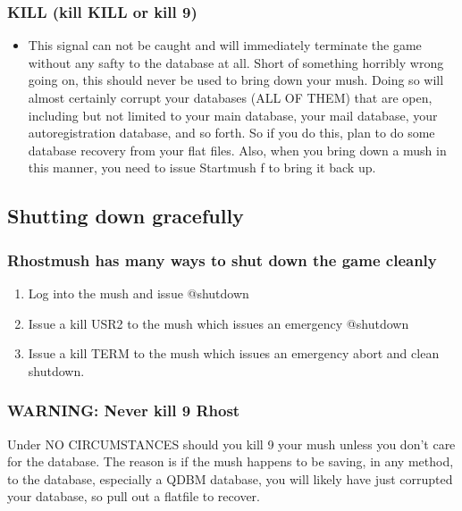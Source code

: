 \documentclass[letterpaper,10pt,english]{sphinxmanual}
\begin{document}
\subsubsection{KILL (kill \sphinxhyphen{}KILL or kill \sphinxhyphen{}9)}
\label{\detokenize{maintenance:kill-kill-kill-or-kill-9}}\begin{itemize}
\item {} 
\sphinxAtStartPar
This signal can not be caught and will immediately terminate the game
without any safty to the database at all.  Short of something horribly
wrong going on, this should never be used to bring down your mush.
Doing so will almost certainly corrupt your databases (ALL OF THEM)
that are open, including but not limited to your main database, your
mail database, your autoregistration database, and so forth.  So if
you do this, plan to do some database recovery from your flat files.
Also, when you bring down a mush in this manner, you need to issue
Startmush \sphinxhyphen{}f to bring it back up.

\end{itemize}


\subsection{Shutting down gracefully}
\label{\detokenize{maintenance:shutting-down-gracefully}}

\subsubsection{Rhostmush has many ways to shut down the game cleanly}
\label{\detokenize{maintenance:rhostmush-has-many-ways-to-shut-down-the-game-cleanly}}\begin{enumerate}
%
\item {} 
\sphinxAtStartPar
Log into the mush and issue @shutdown

\item {} 
\sphinxAtStartPar
Issue a kill \sphinxhyphen{}USR2 to the mush which issues an emergency @shutdown

\item {} 
\sphinxAtStartPar
Issue a kill \sphinxhyphen{}TERM to the mush which issues an emergency abort and clean shutdown.

\end{enumerate}


\subsubsection{WARNING: Never kill \sphinxhyphen{}9 Rhost}
\label{\detokenize{maintenance:warning-never-kill-9-rhost}}
\sphinxAtStartPar
Under NO CIRCUMSTANCES should you kill \sphinxhyphen{}9 your mush unless you don’t care for the
database.  The reason is if the mush happens to be saving, in any method, to the
database, especially a QDBM database, you will likely have just corrupted your
database, so pull out a flatfile to recover.
\end{document}
